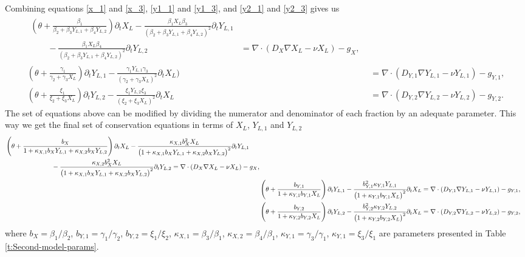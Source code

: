 \documentclass[11pt]{article}
\numberwithin{equation}{section}
\begin{document}
Combining equations \eqref{x_1} and \eqref{x_3}, \eqref{y1_1} and \eqref{y1_3}, and \eqref{y2_1} and \eqref{y2_3} gives us
\begin{align}
	\begin{split} 
		\left(\theta + \frac{\beta_1}{\beta_2 + \beta_3 Y_{L,1} + \beta_4 Y_{L,2}}\right) \partial_t X_L - \frac{\beta_1 X_L \beta_3}{(\beta_2 + \beta_3 Y_{L,1} + \beta_4 Y_{L,2})^2} \partial_t Y_{L,1} \\
		\qquad
		- \frac{\beta_1 X_L \beta_4}{(\beta_2 + \beta_3 Y_{L,1} + \beta_4 Y_{L,2})^2} \partial_t Y_{L,2} 
		 &= \nabla \cdot(D_X \nabla X_L - \nu X_L) - g_X, 
	\end{split} \label{x_4} 
	\\
	(\theta + \frac{\gamma_1}{\gamma_2 + \gamma_3 X_L}) \partial_t Y_{L,1} - \frac{\gamma_1 Y_{L,1} \gamma_3}{(\gamma_2 + \gamma_3 X_L)^2} \partial_t X_L)  &= \nabla \cdot(D_{Y,1} \nabla Y_{L,1} - \nu Y_{L,1}) - g_{Y,1}, \label{y1_4} 
	\\
	(\theta + \frac{\xi_1}{\xi_2 + \xi_3 X_L}) \partial_t Y_{L,2} - \frac{\xi_1 Y_{L,2} \xi_3}{(\xi_2 + \xi_3 X_L)^2} \partial_t X_L &= \nabla \cdot(D_{Y,2} \nabla Y_{L,2} - \nu Y_{L,2}) - g_{Y,2}. \label{y2_4}	
\end{align}
The set of equations above can be modified by dividing the numerator and denominator of each fraction by an adequate parameter. This way we get the final set of conservation equations in terms of $X_L$, $Y_{L,1}$ and $Y_{L,2}$
\begin{subequations}
\begin{align}
	\begin{split} 
		&\left( \theta + \frac{b_X}{1 + \kappa_{X,1} b_{X} Y_{L,1} + \kappa_{X,2} b_{X} Y_{L,2}} \right)
		\partial_t X_L - 
		\frac{\kappa_{X,1} b_X^2 X_L}{\big(1 + \kappa_{X,1} b_{X} Y_{L,1} + \kappa_{X,2} b_{X} Y_{L,2} \big)^2} \partial_t Y_{L,1}
		\\
		&\hspace{2.5cm} -
		\frac{\kappa_{X,2} b_X^2 X_L}{\big(1 + \kappa_{X,1} b_{X} Y_{L,1} + \kappa_{X,2} b_{X} Y_{L,2} \big)^2} \partial_t Y_{L,2}
		= \nabla \cdot(D_X \nabla X_L - \nu X_L) - g_X, 
	\end{split} \label{eq:generalised-x_t}
	\\
	&\left(\theta + \frac{b_{Y,1}}{1 + \kappa_{Y,1} b_{Y,1} X_L}\right) \partial_t Y_{L,1}
	- 
	\frac{b_{Y,1}^2 \kappa_{Y,1} Y_{L,1}}{\big(1 + \kappa_{Y,1} b_{Y,1} X_L\big)^2} \partial_t X_L 
	= \nabla \cdot(D_{Y,1} \nabla Y_{L,1} - \nu Y_{L,1}) - g_{Y,1}, \label{eq:generalised-y_1_t}
	\\
	&\left(\theta + \frac{b_{Y,2}}{1 + \kappa_{Y,2} b_{Y,2} X_L}\right) \partial_t Y_{L,2} - \frac{ b_{Y,2}^2 \kappa_{Y,2} Y_{L,2}}{\big(1 + \kappa_{Y,2} b_{Y,2} X_L\big)^2} \partial_t X_L
	= \nabla \cdot(D_{Y,2} \nabla Y_{L,2} - \nu Y_{L,2}) - g_{Y,2}, \label{eq:generalised-y_2_t}
\end{align}
\end{subequations}
where $b_X = \beta_1 / \beta_2$, $b_{Y,1} = \gamma_1 / \gamma_2$, $b_{Y,2} = \xi_1 / \xi_2$, $\kappa_{X,1} = \beta_3 / \beta_1$, $\kappa_{X,2} = \beta_4 / \beta_1$, $\kappa_{Y,1} = \gamma_3 / \gamma_1$, $\kappa_{Y,1} = \xi_3 / \xi_1$ are parameters presented in Table \ref{t:Second-model-params}.
	
\end{document}
